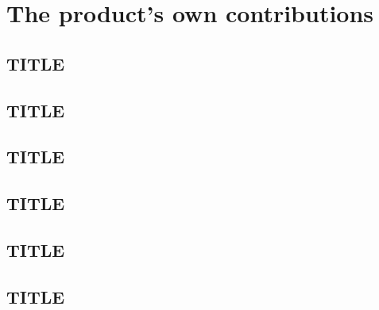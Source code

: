 \chapter{The product's own contributions}
\label{ch:proposed}


\section{TITLE}
\label{sec:bs1}


\section{TITLE}
\label{sec:bs2}


\section{TITLE}
\label{sec:bs3}


\section{TITLE}
\label{sec:bs4}


\section{TITLE}
\label{sec:bs5}


\section{TITLE}
\label{sec:bs6}

